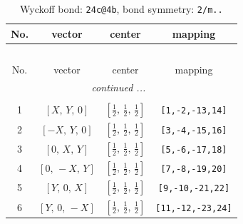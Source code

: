 \documentclass[fleqn,8pt]{jsarticle}
\begin{document}
\renewcommand{\arraystretch}{1.2}
\begin{longtable}{cccc}
\caption{Wyckoff bond: {\tt 24c@4b}, bond symmetry: {\tt 2/m..}}
 \\
 \hline \hline
No. & vector & center & mapping \\ \hline \endfirsthead

\multicolumn{3}{l}{\tablename\ \thetable{}} \\
 \hline \hline
No. & vector & center & mapping \\ \hline \endhead

 \hline \hline
\multicolumn{3}{r}{\footnotesize\it continued ...} \\ \endfoot

 \hline \hline
\multicolumn{3}{r}{} \\ \endlastfoot

1 & $\left[ X,\, Y,\, 0 \right]$ & $\left[ \frac{1}{2},\, \frac{1}{2},\, \frac{1}{2} \right]$ & {\tt [1,-2,-13,14]} \\ \hline
2 & $\left[ - X,\, Y,\, 0 \right]$ & $\left[ \frac{1}{2},\, \frac{1}{2},\, \frac{1}{2} \right]$ & {\tt [3,-4,-15,16]} \\ \hline
3 & $\left[ 0,\, X,\, Y \right]$ & $\left[ \frac{1}{2},\, \frac{1}{2},\, \frac{1}{2} \right]$ & {\tt [5,-6,-17,18]} \\ \hline
4 & $\left[ 0,\, - X,\, Y \right]$ & $\left[ \frac{1}{2},\, \frac{1}{2},\, \frac{1}{2} \right]$ & {\tt [7,-8,-19,20]} \\ \hline
5 & $\left[ Y,\, 0,\, X \right]$ & $\left[ \frac{1}{2},\, \frac{1}{2},\, \frac{1}{2} \right]$ & {\tt [9,-10,-21,22]} \\ \hline
6 & $\left[ Y,\, 0,\, - X \right]$ & $\left[ \frac{1}{2},\, \frac{1}{2},\, \frac{1}{2} \right]$ & {\tt [11,-12,-23,24]} \\
\end{longtable}
\renewcommand{\arraystretch}{1.2}
\end{document}
